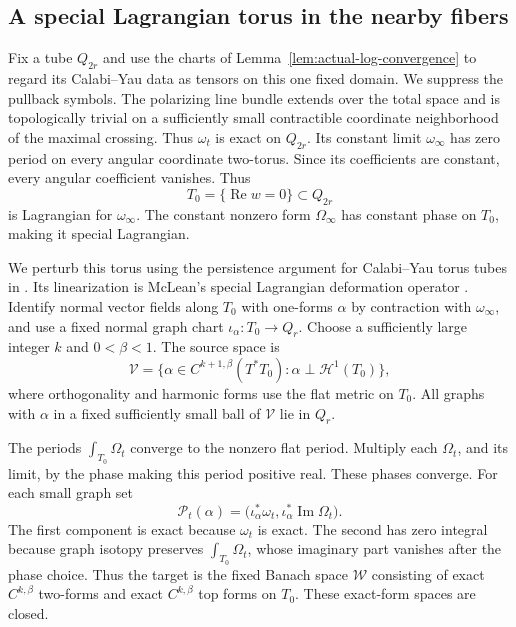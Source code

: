 \subsection{A special Lagrangian torus in the nearby fibers}

Fix a tube $Q_{2r}$ and use the charts of
Lemma~\ref{lem:actual-log-convergence} to regard its Calabi--Yau data
as tensors on this one fixed domain. We suppress the pullback symbols.
The polarizing line bundle extends over the total space and is
topologically trivial on a sufficiently small contractible coordinate
neighborhood of the maximal crossing. Thus $\omega_t$ is exact on
$Q_{2r}$. Its constant limit $\omega_\infty$ has zero period on every
angular coordinate two-torus. Since its coefficients are constant,
every angular coefficient vanishes. Thus
\[
             T_0=\{\operatorname{Re}w=0\}\subset Q_{2r}
\]
is Lagrangian for $\omega_\infty$. The constant nonzero form
$\Omega_\infty$ has constant phase on $T_0$, making it special
Lagrangian.

We perturb this torus using the persistence argument for
Calabi--Yau torus tubes in \cite[Section~4, Lemmas~4.3--4.5]{Zhang}.
Its linearization is McLean's special Lagrangian deformation operator
\cite{McLean}. Identify normal vector fields along $T_0$ with one-forms
$\alpha$ by contraction with $\omega_\infty$, and use a fixed normal
graph chart $\iota_\alpha:T_0\to Q_r$. Choose a sufficiently large
integer $k$ and $0<\beta<1$. The source space is
\[
 \mathcal V=\{\alpha\in C^{k+1,\beta}(T^*T_0):
               \alpha\perp\mathcal H^1(T_0)\},
\]
where orthogonality and harmonic forms use the flat metric on $T_0$.
All graphs with $\alpha$ in a fixed sufficiently small ball of
$\mathcal V$ lie in $Q_r$.

The periods $\int_{T_0}\Omega_t$ converge to the nonzero flat period.
Multiply each $\Omega_t$, and its limit, by the phase making this
period positive real. These phases converge. For each small graph set
\[
 \mathcal P_t(\alpha)=
   \bigl(\iota_\alpha^*\omega_t,
          \iota_\alpha^*\operatorname{Im}\Omega_t\bigr).
\]
The first component is exact because $\omega_t$ is exact. The second
has zero integral because graph isotopy preserves
$\int_{T_0}\Omega_t$, whose imaginary part vanishes after the phase
choice. Thus the target is the fixed Banach space $\mathcal W$ consisting of exact
$C^{k,\beta}$ two-forms and exact $C^{k,\beta}$ top forms on $T_0$.
These exact-form spaces are closed.

